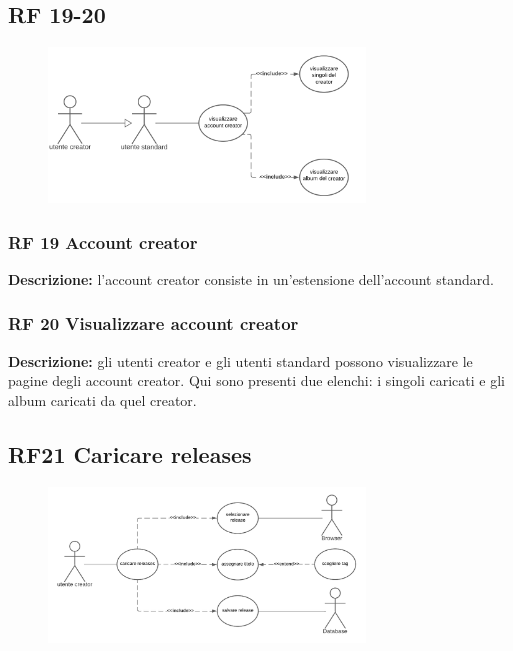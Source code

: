 \documentclass[a4paper,12pt]{article}
\begin{document}
\subsection*{RF 19-20}

\begin{figure}[htp]
    \centering
    \includegraphics[width=0.75\textwidth]{diagrams/use-case-19-20.png}
\end{figure}

\subsubsection*{RF 19 Account creator}

\textbf{Descrizione:} l’account creator consiste in un'estensione dell'account standard.

\subsubsection*{RF 20 Visualizzare account creator}

\textbf{Descrizione:} gli utenti creator e gli utenti standard possono visualizzare le pagine degli account creator. Qui sono presenti due elenchi: i singoli caricati e gli album caricati da quel creator.

\subsection*{RF21 Caricare releases}

\begin{figure}[htp]
    \centering
    \includegraphics[width=0.75\textwidth]{diagrams/use-case-21.png}
\end{figure}
\end{document}
